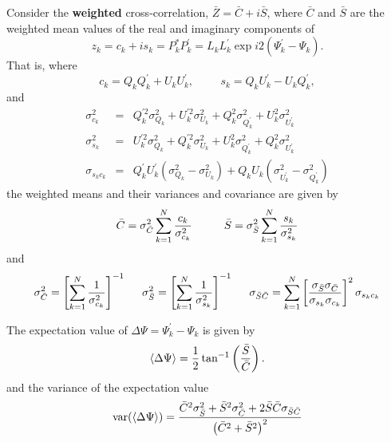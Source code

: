 \documentclass[12pt]{article}
\begin{document}
Consider the {\bf weighted} cross-correlation,
$\bar{Z}=\bar{C}+i\bar{S}$, where $\bar C$ and $\bar S$ are the
weighted mean values of the real and imaginary components of
\begin{equation}
z_k = c_k + i s_k 
    = P^*_k P^\prime_k = L_k L^\prime_k \exp i2(\Psi^\prime_k - \Psi_k).
\end{equation}
That is, where
\begin{equation}
c_k = Q_kQ^\prime_k + U_kU^\prime_k,
\hspace{1cm}
s_k = Q_kU^\prime_k - U_kQ^\prime_k,
\label{eqn:ck_sk}
\end{equation}
and
\begin{eqnarray}
\sigma_{c_k}^2 & = &
 Q^{\prime2}_k\sigma_{Q_k}^2 + U^{\prime2}_k\sigma_{U_k}^2 +
 Q^2_k\sigma_{Q^\prime_k}^2 + U^2_k\sigma_{U^\prime_k}^2 \label{eqn:var_ck} \\
\sigma_{s_k}^2 & = &
 U^{\prime2}_k\sigma_{Q_k}^2 + Q^{\prime2}_k\sigma_{U_k}^2 +
 U^2_k\sigma_{Q^\prime_k}^2 + Q^2_k\sigma_{U^\prime_k}^2 \label{eqn:var_sk} \\
\sigma_{s_k c_k} & = &
 Q^\prime_k U^\prime_k (\sigma_{Q_k}^2 - \sigma_{U_k}^2) +
 Q_kU_k (\sigma_{U^\prime_k}^2 -\sigma_{Q^\prime_k}^2)
\label{eqn:covar_ck_sk}
\end{eqnarray}
the weighted means and their variances and covariance are given by
\begin{equation}
\bar C = \sigma_{\bar C}^2 \sum_{k=1}^N { c_k \over \sigma_{c_k}^2 }
\hspace{1cm}
\bar S = \sigma_{\bar S}^2 \sum_{k=1}^N { s_k \over \sigma_{s_k}^2 }
\label{eqn:barC_barS}
\end{equation}
and
\begin{equation}
\sigma_{\bar C}^2 = \left[ \sum_{k=1}^N{1\over\sigma_{c_k}^2} \right]^{-1}
\hspace{5mm}
\sigma_{\bar S}^2 = \left[ \sum_{k=1}^N{1\over\sigma_{s_k}^2} \right]^{-1}
\hspace{5mm}
\sigma_{\bar S \bar C} = \sum_{k=1}^N
\left[\sigma_{\bar S}\sigma_{\bar C}\over\sigma_{s_k}\sigma_{c_k}\right]^2
                         \sigma_{s_k c_k}
\label{eqn:var_covar_barC_barS}
\end{equation}

\noindent
The expectation value of $\Delta\Psi=\Psi^\prime_k - \Psi_k$ is given by
\begin{equation}
\langle\Delta\Psi\rangle
={1\over2}\tan^{-1}\left({\bar S\over\bar C}\right).
\end{equation}
and the variance of the expectation value
\begin{equation}
{\mathrm{var}}(\langle\Delta\Psi\rangle) = 
{ \bar C^2\sigma_{\bar S}^2 + \bar S^2\sigma_{\bar C}^2
  + 2 \bar S\bar C \sigma_{\bar S \bar C} \over 
  \left(\bar C^2 + \bar S^2\right)^2 }
\label{eqn:var_delta_Psi}
\end{equation}
\end{document}
